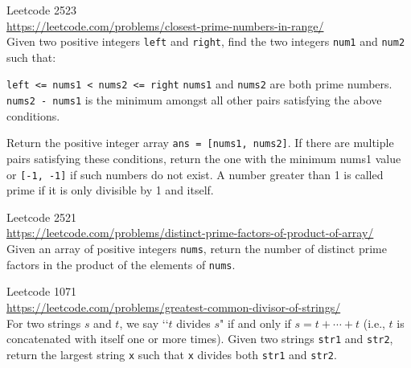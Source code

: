 \begin{ex}
  Leetcode 2523 \\
  \url{https://leetcode.com/problems/closest-prime-numbers-in-range/} \\
  Given two positive integers \verb!left! and \verb!right!, find the two integers \verb!num1! and \verb!num2! such that:
  \begin{enumerate}
  \li \verb!left <= nums1 < nums2 <= right!
  \li \verb!nums1! and \verb!nums2! are both prime numbers.
  \li \verb!nums2 - nums1! is the minimum amongst all other pairs satisfying the above conditions.
  \end{enumerate}
  Return the positive integer array \verb!ans = [nums1, nums2]!.
  If there are multiple pairs satisfying these conditions,
  return the one with the minimum nums1 value or \verb![-1, -1]! if such numbers do not exist.
  A number greater than 1 is called prime if it is only divisible by 1 and itself.
\end{ex}

\begin{ex}
  Leetcode 2521 \\
  \url{https://leetcode.com/problems/distinct-prime-factors-of-product-of-array/} \\
  Given an array of positive integers \verb!nums!,
  return the number of distinct prime factors in the product of the elements of \verb!nums!.
\end{ex}

\begin{ex}
  Leetcode 1071 \\
  \url{https://leetcode.com/problems/greatest-common-divisor-of-strings/} \\
  For two strings $s$ and $t$, we say
  \lq\lq $t$ divides $s$" if and only if $s = t + \cdots + t$
  (i.e., $t$ is concatenated with itself one or more times).
  Given two strings \verb!str1! and \verb!str2!, return the largest string
  \verb!x! such that \verb!x! divides both \verb!str1! and \verb!str2!.
\end{ex}
